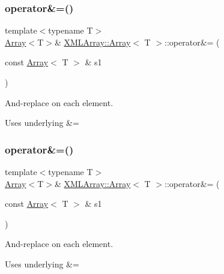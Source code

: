 \subsubsection{\texorpdfstring{operator\&=()}{operator\&=()}\hspace{0.1cm}{\footnotesize\ttfamily [1/6]}}
{\footnotesize\ttfamily template$<$typename T$>$ \\
\mbox{\hyperlink{classXMLArray_1_1Array}{Array}}$<$T$>$\& \mbox{\hyperlink{classXMLArray_1_1Array}{X\+M\+L\+Array\+::\+Array}}$<$ T $>$\+::operator\&= (\begin{DoxyParamCaption}\item[{const \mbox{\hyperlink{classXMLArray_1_1Array}{Array}}$<$ T $>$ \&}]{s1 }\end{DoxyParamCaption})\hspace{0.3cm}{\ttfamily [inline]}}



And-\/replace on each element. 

Uses underlying \&= \mbox{\label{classXMLArray_1_1Array_a7a015abc3dfa498a8feb234b51d4c341}} 
\subsubsection{\texorpdfstring{operator\&=()}{operator\&=()}\hspace{0.1cm}{\footnotesize\ttfamily [2/6]}}
{\footnotesize\ttfamily template$<$typename T$>$ \\
\mbox{\hyperlink{classXMLArray_1_1Array}{Array}}$<$T$>$\& \mbox{\hyperlink{classXMLArray_1_1Array}{X\+M\+L\+Array\+::\+Array}}$<$ T $>$\+::operator\&= (\begin{DoxyParamCaption}\item[{const \mbox{\hyperlink{classXMLArray_1_1Array}{Array}}$<$ T $>$ \&}]{s1 }\end{DoxyParamCaption})\hspace{0.3cm}{\ttfamily [inline]}}



And-\/replace on each element. 

Uses underlying \&= \mbox{\label{classXMLArray_1_1Array_a7a015abc3dfa498a8feb234b51d4c341}} 
